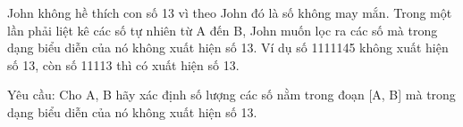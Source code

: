 John không hề thích con số 13 vì theo John đó là số không may mắn. Trong một lần phải liệt kê các số tự nhiên từ A đến B, John muốn lọc ra các số mà trong dạng biểu diễn của nó không xuất hiện số 13. Ví dụ số 1111145 không xuất hiện số 13, còn số 11113 thì có xuất hiện số 13.  

   Yêu cầu: Cho A, B hãy xác định số lượng các số nằm trong đoạn [A, B] mà trong dạng biểu diễn của nó không xuất hiện số 13.